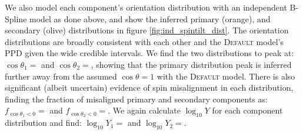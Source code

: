 We also model each component's orientation distribution with an independent B-Spline model as done above, and show the inferred 
primary (orange), and secondary (olive) distributions in figure \ref{fig:ind_spintilt_dist}. The orientation distributions are broadly
consistent with each other and the \textsc{Default} model's PPD given the wide credible intervals. We find the two distributions to peak at: $\cos{\theta_1}=$\result{$\CIPlusMinus{\macros[BSplineIndependentCompSpins][peakCosTilt1]}$} 
and $\cos{\theta_2}=$\result{$\CIPlusMinus{\macros[BSplineIndependentCompSpins][peakCosTilt2]}$}, showing that the primary distribution peak is inferred further away 
from the assumed $\cos{\theta}=1$ with the \textsc{Default} model. There is also significant (albeit uncertain) evidence of spin misalignment in each distribution, finding 
the fraction of misaligned primary and secondary components as: $f_{\cos{\theta_1}<0}=$\result{$\CIPlusMinus{\macros[BSplineIndependentCompSpins][negFrac1]}$} and 
$f_{\cos{\theta_2}<0}=$\result{$\CIPlusMinus{\macros[BSplineIndependentCompSpins][negFrac2]}$}. We again calculate $\log_{10}Y$  
for each component distribution and find: $\log_{10}Y_1=$ and 
$\log_{10}Y_2=$.

